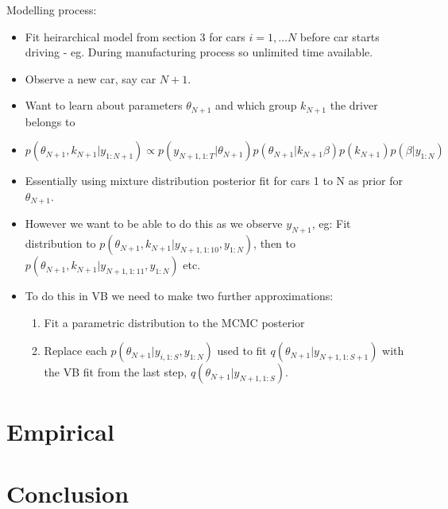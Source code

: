 \documentclass[12pt,a4paper]{article}\usepackage[]{graphicx}\usepackage[]{color}
\begin{document}
Modelling process:
\begin{itemize}
\item Fit heirarchical model from section 3 for cars $i = 1, \dots N$ before car starts driving - eg. During manufacturing process so unlimited time available.
\item Observe a new car, say car $N + 1$.
\item Want to learn about parameters $\theta_{N+1}$ and which group $k_{N+1}$ the driver belongs to
\item $p(\theta_{N+1}, k_{N+1} | y_{1:N+1}) \propto p(y_{N+1, 1:T} | \theta_{N+1}) p(\theta_{N+1} | k_{N+1} \beta)p(k_{N+1}) p(\beta | y_{1:N})$
\item Essentially using mixture distribution posterior fit for cars 1 to N as prior for $\theta_{N+1}$.
\item However we want to be able to do this as we observe $y_{N+1}$, eg: Fit distribution to $p(\theta_{N+1}, k_{N+1} | y_{N+1, 1:10}, y_{1:N})$, then to $p(\theta_{N+1}, k_{N+1} | y_{N+1, 1:11}, y_{1:N})$ etc.
\item To do this in VB we need to make two further approximations:
\begin{enumerate}
\item Fit a parametric distribution to the MCMC posterior
\item Replace each  $p(\theta_{N+1} | y_{i, 1:S}, y_{1:N})$ used to fit $q(\theta_{N+1} | y_{N+1, 1:S+1})$ with the VB fit from the last step, $q(\theta_{N+1} | y_{N+1, 1:S})$.
\end{enumerate}
\end{itemize}

\section{Empirical}

\section{Conclusion}
\end{document}

